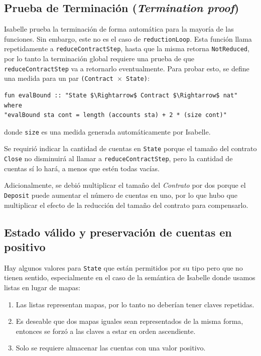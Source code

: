 \documentclass[12pt]{book}
\begin{document}
\subsection{Prueba de Terminación (\textit{Termination proof})}
Isabelle prueba la terminación de forma automática para la mayoría de las funciones. Sin embargo, este no es el caso de \texttt{reductionLoop}. Esta función llama repetidamente a \texttt{reduceContractStep}, hasta que la misma retorna \texttt{NotReduced}, por lo tanto la terminación global requiere una prueba de que \texttt{reduceContractStep} va a retornarlo eventualmente. Para probar esto, se define una medida para un par \texttt{(Contract $\times$ State)}:

\begin{lstlisting}[style=Isabelle]
fun evalBound :: "State $\Rightarrow$ Contract $\Rightarrow$ nat" where
"evalBound sta cont = length (accounts sta) + 2 * (size cont)"
\end{lstlisting}
donde \texttt{size} es una medida generada automáticamente por Isabelle. 

Se requirió indicar la cantidad de cuentas en \texttt{State} porque el tamaño del contrato \texttt{Close} no disminuirá al llamar a \texttt{reduceContractStep}, pero la cantidad de cuentas sí lo hará, a menos que estén todas vacías.

Adicionalmente, se debió multiplicar el tamaño del \textit{Contrato} por dos porque el \texttt{Deposit} puede aumentar el número de cuentas en uno, por lo que hubo que multiplicar el efecto de la reducción del tamaño del contrato para compensarlo.

\subsection{Estado válido y preservación de cuentas en positivo}
Hay algunos valores para \texttt{State} que están permitidos por su tipo pero que no tienen sentido, especialmente en el caso de la semántica de Isabelle donde usamos listas en lugar de mapas:

\begin{enumerate}
    \item Las listas representan mapas, por lo tanto no deberían tener claves repetidas.
    \item Es deseable que dos mapas iguales sean representados de la misma forma, entonces se forzó a las claves a estar en orden ascendiente.
    \item Solo se requiere almacenar las cuentas con una valor positivo.
\end{enumerate}
\end{document}
